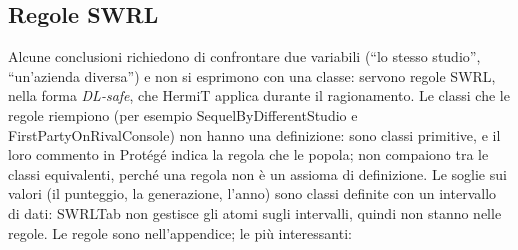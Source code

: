 \documentclass[10pt,a4paper]{article}
\newcommand{\cls}[1]{\textsf{#1}}
\begin{document}
\subsection{Regole SWRL}
Alcune conclusioni richiedono di confrontare due variabili (``lo stesso studio'', ``un'azienda diversa'') e non si esprimono con una classe: servono regole SWRL, nella forma \emph{DL-safe}, che HermiT applica durante il ragionamento. Le classi che le regole riempiono (per esempio \cls{SequelByDifferentStudio} e \cls{FirstPartyOnRivalConsole}) non hanno una definizione: sono classi primitive, e il loro commento in Protégé indica la regola che le popola; non compaiono tra le classi equivalenti, perché una regola non è un assioma di definizione. Le soglie sui valori (il punteggio, la generazione, l'anno) sono classi definite con un intervallo di dati: SWRLTab non gestisce gli atomi sugli intervalli, quindi non stanno nelle regole. Le \nRegole{} regole sono nell'appendice; le più interessanti:
\end{document}
